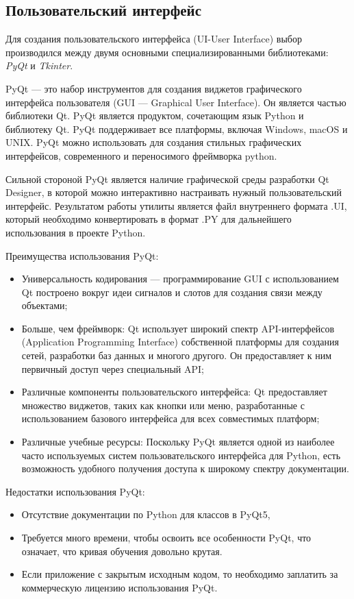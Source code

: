 \subsection{Пользовательский интерфейс}

Для создания пользовательского интерфейса (UI-User Interface) выбор производился между двумя основными специализированными библиотеками: \textit{PyQt} и \textit{Tkinter}.

PyQt --- это набор инструментов для создания виджетов графического интерфейса пользователя (GUI --- Graphical User Interface). Он является частью библиотеки Qt. PyQt является продуктом, сочетающим язык Python и библиотеку Qt. PyQt поддерживает все платформы, включая Windows, macOS и UNIX. PyQt можно использовать для создания стильных графических интерфейсов, современного и переносимого фреймворка python.

Сильной стороной PyQt является наличие графической среды разработки Qt Designer, в которой можно интерактивно настраивать нужный пользовательский интерфейс. Результатом работы утилиты является файл внутреннего формата .UI, который необходимо конвертировать в формат .PY для дальнейшего использования в проекте Python.

Преимущества использования PyQt:
\begin{itemize}
	\item Универсальность кодирования --- программирование GUI с использованием Qt построено вокруг идеи сигналов и слотов для создания связи между объектами;
	\item Больше, чем фреймворк: Qt использует широкий спектр API-интерфейсов (Application Programming Interface) собственной платформы для создания сетей, разработки баз данных и многого другого. Он предоставляет к ним первичный доступ через специальный API;
	\item Различные компоненты пользовательского интерфейса: Qt предоставляет множество виджетов, таких как кнопки или меню, разработанные с использованием базового интерфейса для всех совместимых платформ;
	\item Различные учебные ресурсы: Поскольку PyQt является одной из наиболее часто используемых систем пользовательского интерфейса для Python, есть возможность удобного получения доступа к широкому спектру документации.
\end{itemize}

Недостатки использования PyQt:
\begin{itemize}
	\item Отсутствие документации по Python для классов в PyQt5,
	\item Требуется много времени, чтобы освоить все особенности PyQt, что означает, что кривая обучения довольно крутая.
	\item Если приложение с закрытым исходным кодом, то необходимо заплатить за коммерческую лицензию использования PyQt.
\end{itemize}

